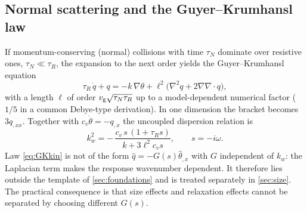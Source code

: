 \subsection{Normal scattering and the Guyer--Krumhansl law}
If momentum-conserving (normal) collisions with time $\tau_N$ dominate over resistive ones, $\tau_N\ll\tau_R$, the expansion to the next order yields the Guyer--Krumhansl equation
\begin{equation}\label{eq:GKkin}
\tau_R\,\dot q+q=-k\,\nabla\theta+\ell^{2}\bigl(\nabla^{2}q+2\nabla\nabla\!\cdot q\bigr),
\end{equation}
with a length $\ell$ of order $v_{\rm g}\sqrt{\tau_N\tau_R}$ up to a model-dependent numerical factor ($1/5$ in a common Debye-type derivation). In one dimension the bracket becomes $3q_{,xx}$. Together with $c_v\dot\theta=-q_{,x}$ the uncoupled dispersion relation is
\begin{equation}\label{eq:GKdisp}
k_w^{2}=-\,\frac{c_v\,s\,(1+\tau_R s)}{k+3\ell^{2}c_v s},\qquad s=-i\omega .
\end{equation}
Law \cref{eq:GKkin} is not of the form $\hat q=-G(s)\hat\theta_{,x}$ with $G$ independent of $k_w$: the Laplacian term makes the response wavenumber dependent. It therefore lies outside the template of \cref{sec:foundations} and is treated separately in \cref{sec:size}. The practical consequence is that size effects and relaxation effects cannot be separated by choosing different $G(s)$.



